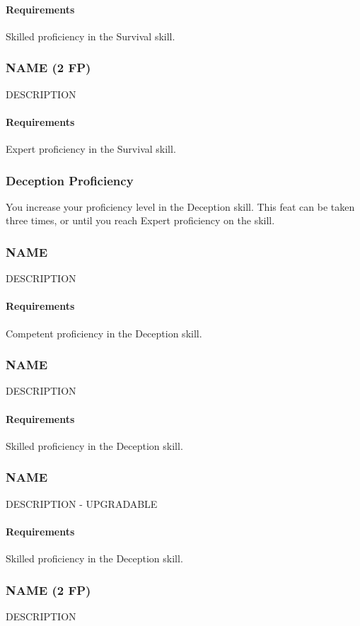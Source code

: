     \paragraph{Requirements} Skilled proficiency in the Survival skill.
\subsubsection{NAME (2 FP)} \label{feat::name}
    DESCRIPTION
    \paragraph{Requirements} Expert proficiency in the Survival skill.
\subsubsection{Deception Proficiency} \label{feat::deceptionprof}
    You increase your proficiency level in the Deception skill.
    This feat can be taken three times, or until you reach Expert proficiency on the skill.
\subsubsection{NAME} \label{feat::name}
    DESCRIPTION
    \paragraph{Requirements} Competent proficiency in the Deception skill.
\subsubsection{NAME} \label{feat::name}
    DESCRIPTION
    \paragraph{Requirements} Skilled proficiency in the Deception skill.
\subsubsection{NAME} \label{feat::name}
    DESCRIPTION - UPGRADABLE
    \paragraph{Requirements} Skilled proficiency in the Deception skill.
\subsubsection{NAME (2 FP)} \label{feat::name}
    DESCRIPTION
